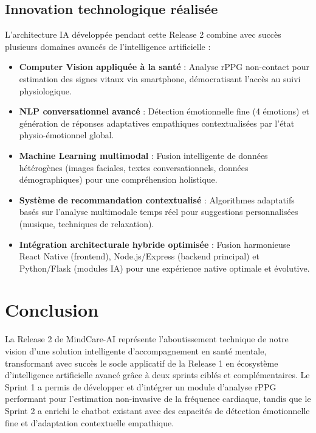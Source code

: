 \subsection{Innovation technologique réalisée}
L'architecture IA développée pendant cette Release 2 combine avec succès plusieurs domaines avancés de l'intelligence artificielle :
\begin{itemize}
    \item \textbf{Computer Vision appliquée à la santé} : Analyse rPPG non-contact pour estimation des signes vitaux via smartphone, démocratisant l'accès au suivi physiologique.
    
    \item \textbf{NLP conversationnel avancé} : Détection émotionnelle fine (4 émotions) et génération de réponses adaptatives empathiques contextualisées par l'état physio-émotionnel global.
    
    \item \textbf{Machine Learning multimodal} : Fusion intelligente de données hétérogènes (images faciales, textes conversationnels, données démographiques) pour une compréhension holistique.
    
    \item \textbf{Système de recommandation contextualisé} : Algorithmes adaptatifs basés sur l'analyse multimodale temps réel pour suggestions personnalisées (musique, techniques de relaxation).
    
    \item \textbf{Intégration architecturale hybride optimisée} : Fusion harmonieuse React Native (frontend), Node.js/Express (backend principal) et Python/Flask (modules IA) pour une expérience native optimale et évolutive.
\end{itemize}


\section{Conclusion}
La Release 2 de MindCare-AI représente l'aboutissement technique de notre vision d'une solution intelligente d'accompagnement en santé mentale, transformant avec succès le socle applicatif de la Release 1 en écosystème d'intelligence artificielle avancé grâce à deux sprints ciblés et complémentaires. Le Sprint 1 a permis de développer et d'intégrer un module d'analyse rPPG performant pour l'estimation non-invasive de la fréquence cardiaque, tandis que le Sprint 2 a enrichi le chatbot existant avec des capacités de détection émotionnelle fine  et d'adaptation contextuelle empathique.

